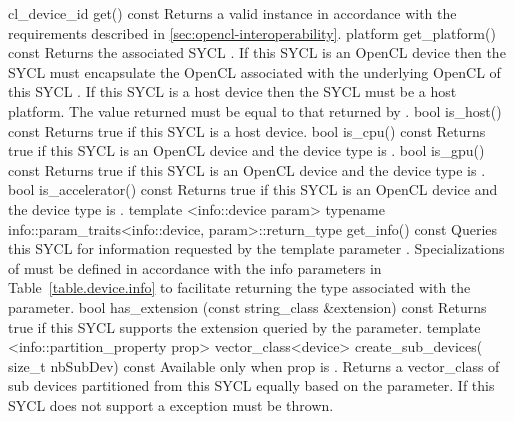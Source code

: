   \addRow
    {cl_device_id get() const}
    { 
      Returns a valid  instance in accordance with the requirements described in \ref{sec:opencl-interoperability}.
    }
  \addRow
   {platform get_platform() const}
   {
     Returns the associated SYCL . If this SYCL  is an OpenCL device then the SYCL  must encapsulate the OpenCL  associated with the underlying OpenCL  of this SYCL . If this SYCL  is a host device then the SYCL  must be a host platform. The value returned must be equal to that returned by .
   }
  \addRow
    {bool is_host() const}
    {
      Returns true if this SYCL  is a host device.
    }
   \addRow
    {bool is_cpu() const}
    {
      Returns true if this SYCL  is an OpenCL device and the device type is .
    }
   \addRow
    {bool is_gpu() const}
    {
      Returns true if this SYCL  is an OpenCL device and the device type is .
    }
   \addRow
    {bool is_accelerator() const}
    {
      Returns true if this SYCL  is an OpenCL device and the device type is .
    }
  \addRowTwoL
    {template <info::device param> typename info::param_traits<info::device, param>::return_type}
    {  get_info() const}
    {
      Queries this SYCL  for information requested by the template parameter .
      Specializations of  must be defined in accordance with the info parameters in Table~\ref{table.device.info} to facilitate returning the type associated with the  parameter.
    }
  \addRow
    {bool has_extension (const string_class \&extension) const}
    {
      Returns true if this SYCL  supports the extension queried by the  parameter.     
    }
  \addRowThreeSL
    {template <info::partition_property prop>}
    {vector_class<device> create_sub_devices(}
    { size_t nbSubDev) const}
    {
      Available only when prop is .
      Returns a vector_class of sub devices partitioned from this SYCL  equally based on the  parameter.   
      If this SYCL  does not support  a  exception must be thrown.
    }
